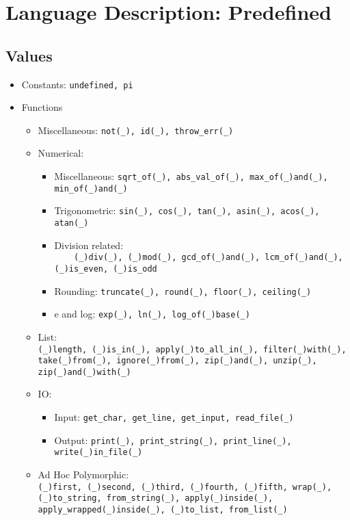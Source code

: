 \documentclass{article}
\begin{document}
\newpage

\section{Language Description: Predefined}

\subsection{Values}

\begin{itemize}

\item Constants: \verb|undefined, pi|

\item Functions
  \begin{itemize}

  \item Miscellaneous: \verb|not(_), id(_), throw_err(_)|

  \item Numerical:
    \begin{itemize}
    \item Miscellaneous:
      \verb|sqrt_of(_), abs_val_of(_), max_of(_)and(_), min_of(_)and(_)|
    \item Trigonometric:
      \verb|sin(_), cos(_), tan(_), asin(_), acos(_), atan(_)|
    \item Division related: \\
      \verb|    (_)div(_), (_)mod(_), gcd_of(_)and(_), lcm_of(_)and(_),|
      \verb|(_)is_even, (_)is_odd|
    \item Rounding:
      \verb|truncate(_), round(_), floor(_), ceiling(_)|
    \item e and log:
      \verb|exp(_), ln(_), log_of(_)base(_)|
    \end{itemize}

  \item List:\\
    \verb|(_)length, (_)is_in(_), apply(_)to_all_in(_), filter(_)with(_), |
    \\
    \verb|take(_)from(_), ignore(_)from(_), zip(_)and(_), unzip(_), |
    \verb|zip(_)and(_)with(_)|

  \item IO:
    \begin{itemize}
    \item Input: \verb|get_char, get_line, get_input, read_file(_)|
    \item Output:
      \verb|print(_), print_string(_), print_line(_), write(_)in_file(_)|
    \end{itemize}

  \item Ad Hoc Polymorphic:\\
  \verb|(_)first, (_)second, (_)third, (_)fourth, (_)fifth, wrap(_), |
  \\
  \verb|(_)to_string, from_string(_), apply(_)inside(_), |
  \\
  \verb|apply_wrapped(_)inside(_), (_)to_list, from_list(_)|

  \end{itemize}
\end{itemize}
\end{document}

